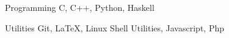 

\begin{cvskills}






  \cvskill
    {Programming} %
    {C, C++, Python, Haskell} %

  \cvskill
    {Utilities} %
    {Git, LaTeX, Linux Shell Utilities, Javascript, Php} %

\end{cvskills}